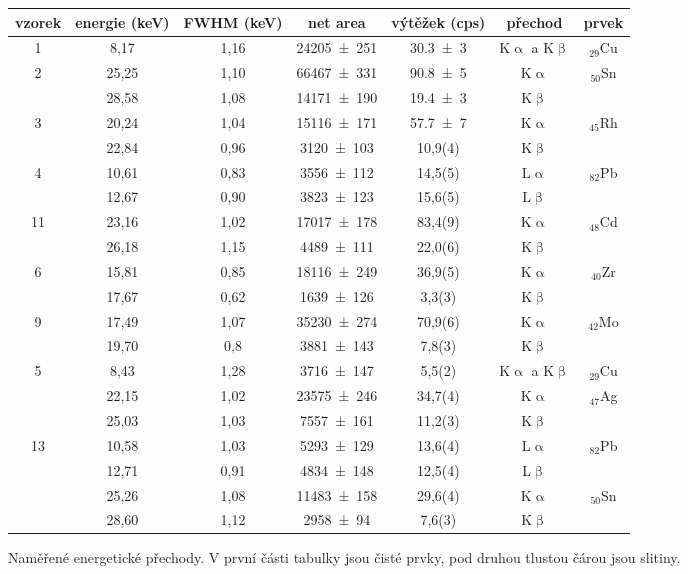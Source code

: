 \begin{tabulka}[htbp]
\centering
\begin{tabular}{c||ccccc|c}
vzorek & energie (\si{\keV}) & FWHM (\si{\keV}) & net area & výtěžek (cps) & přechod & prvek \\ \hline\hline

1 & 8,17 & 1,16 & \num{24205(251)} & \num{30,3(3)} & K$\upalpha$ a K$\upbeta$ & $_{29}$Cu \\  \hline
\multirow{2}{*}{2} & 25,25 & 1,10 & \num{66467(331)} & \num{90,8(5)} & K$\upalpha$ & \multirow{2}{*}{$_{50}$Sn} \\
 & 28,58 & 1,08 & \num{14171(190)} & \num{19,4(3)} & K$\upbeta$ &  \\ \hline
\multirow{2}{*}{3} & 20,24 & 1,04 & \num{15116(171)} & \num{57,7(7)} & K$\upalpha$ & \multirow{2}{*}{$_{45}$Rh} \\ 
 & 22,84 & 0,96 & \num{3120(103)} & 10,9(4) & K$\upbeta$ & \\ \hline
\multirow{2}{*}{4} & 10,61 & 0,83 & \num{3556(112)} & 14,5(5) & L$\upalpha$ & \multirow{2}{*}{$_{82}$Pb} \\ 
 & 12,67 & 0,90 & \num{3823(123)} & 15,6(5) & L$\upbeta$ & \\ \hline
\multirow{2}{*}{11} & 23,16 & 1,02 & \num{17017(178)} & 83,4(9) & K$\upalpha$ & \multirow{2}{*}{$_{48}$Cd} \\ 
 & 26,18 & 1,15 & \num{4489(111)} & 22,0(6) & K$\upbeta$ & \\ \hline
\multirow{2}{*}{6} & 15,81 & 0,85 & \num{18116(249)} & 36,9(5) & K$\upalpha$ & \multirow{2}{*}{$_{40}$Zr} \\
 & 17,67 & 0,62 & \num{1639(126)} & 3,3(3) & K$\upbeta$ &  \\ \hline
\multirow{2}{*}{9} & 17,49 & 1,07 & \num{35230(274)} & 70,9(6) & K$\upalpha$ & \multirow{2}{*}{$_{42}$Mo} \\ 
 & 19,70 & 0,8 & \num{3881(143)} & 7,8(3) & K$\upbeta$ &  \\ \hline\hline
\multirow{3}{*}{5} & 8,43 & 1,28 & \num{3716(147)} & 5,5(2) & K$\upalpha$ a K$\upbeta$ & $_{29}$Cu \\
 & 22,15 & 1,02 & \num{23575(246)} & 34,7(4) & K$\upalpha$ & \multirow{2}{*}{$_{47}$Ag} \\
 & 25,03 & 1,03 & \num{7557(161)} & 11,2(3) & K$\upbeta$ & \\ \hline
\multirow{4}{*}{13} & 10,58 & 1,03 & \num{5293(129)} & 13,6(4) & L$\upalpha$ & \multirow{2}{*}{$_{82}$Pb} \\ 
 & 12,71 & 0,91 & \num{4834(148)} & 12,5(4) & L$\upbeta$ &  \\
 & 25,26 & 1,08 & \num{11483(158)} & 29,6(4) & K$\upalpha$ & \multirow{2}{*}{$_{50}$Sn} \\
 & 28,60 & 1,12 & \num{2958(94)} & 7,6(3) & K$\upbeta$ &  \\ 
\end{tabular}
\caption{Naměřené energetické přechody. V první části tabulky jsou čisté prvky, pod druhou tlustou čárou jsou slitiny.}
\label{t:merenivzorky}
\end{tabulka}


